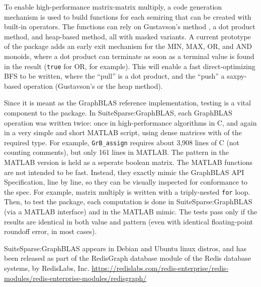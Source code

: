 To enable high-performance matrix-matrix multiply, a code generation mechanism
is used to build functions for each semiring that can be created with built-in
operators.  The functions can rely on Gustavson's method \cite{Gustavson78}, a
dot product method, and heap-based method, all with masked variants.  A current
prototype of the package adds an early exit mechanism for the MIN, MAX, OR, and
AND monoids, where a dot product can terminate as soon as a terminal value is
found in the result (\verb'true' for OR, for example).  This will enable a fast
direct-optimizing BFS to be written, where the ``pull'' is a dot product, and
the ``push'' a saxpy-based operation (Gustavson's or the heap method).

Since it is meant as the GraphBLAS reference implementation, testing is a vital
component to the package.  In SuiteSparse:GraphBLAS, each GraphBLAS operation
was written twice: once in high-performance algorithms in C, and again in a
very simple and short MATLAB script, using dense matrices with of the required
type.  For example, \verb'GrB_assign' requires about 3,908 lines of C (not
counting comments), but only 161 lines in MATLAB.  The pattern in the MATLAB
version is held as a seperate boolean matrix.  The MATLAB functions are not
intended to be fast.  Instead, they exactly mimic the GraphBLAS API
Specification, line by line, so they can be visually inspected for conformance
to the spec.  For example, matrix multiply is written with a triply-nested
\verb'for' loop.  Then, to test the package, each computation is done in
SuiteSparse:GraphBLAS (via a MATLAB interface) and in the MATLAB mimic.  The
tests pass only if the results are identical in both value and pattern (even
with identical floating-point roundoff error, in most cases).

SuiteSparse:GraphBLAS appears in Debian and Ubuntu linux distros,
and has been released as part of the RedisGraph database
module of the Redis database systems, by RedisLabs, Inc.
\url{https://redislabs.com/redis-enterprise/redis-modules/redis-enterprise-modules/redisgraph/}


